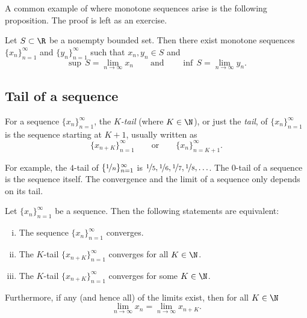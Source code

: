 A common example of where monotone sequences arise is the following
proposition.  The proof is left as an exercise.

\begin{prop} \label{prop:supinfseq}
Let $S \subset \R$ be a nonempty bounded set.
Then there exist monotone sequences
$\{ x_n \}_{n=1}^\infty$ and $\{ y_n \}_{n=1}^\infty$ such that $x_n, y_n \in S$ and
\begin{equation*}
\sup\,S = \lim_{n\to \infty} x_n \qquad \text{and} \qquad \inf\,S =
\lim_{n\to\infty} y_n .
\end{equation*}
\end{prop}

\subsection{Tail of a sequence}

\begin{defn}
For a sequence $\{ x_n \}_{n=1}^\infty$,
the \emph{$K$-tail} (where $K \in \N$),
or just the
\emph{tail}, of
$\{ x_n \}_{n=1}^\infty$ is the sequence starting at $K+1$, usually written as
\begin{equation*}
\{ x_{n+K} \}_{n=1}^\infty
\qquad \text{or} \qquad \{ x_n \}_{n=K+1}^\infty .
\end{equation*}
\end{defn}

For example, the $4$-tail of $\{ \nicefrac{1}{n} \}_{n=1}^\infty$ is
$\nicefrac{1}{5}, \nicefrac{1}{6}, \nicefrac{1}{7}, \nicefrac{1}{8},
\ldots$.  The $0$-tail of a sequence is the sequence itself.
The convergence and the limit of a sequence only depends on its tail.

\begin{prop}
Let $\{ x_n \}_{n=1}^\infty$ be a sequence.  Then the following
statements are equivalent:
\begin{enumerate}[(i)]
\item \label{prop:ktail:i}
The sequence $\{ x_n \}_{n=1}^\infty$ converges.
\item \label{prop:ktail:ii}
The $K$-tail $\{ x_{n+K} \}_{n=1}^\infty$ converges for all $K \in \N$.
\item \label{prop:ktail:iii}
The $K$-tail $\{ x_{n+K} \}_{n=1}^\infty$ converges for some $K \in \N$.
\end{enumerate}
Furthermore, if any (and hence all) of the limits exist, then for all $K \in \N$
\begin{equation*}
\lim_{n\to \infty} x_n = \lim_{n \to \infty} x_{n+K} .
\end{equation*}
\end{prop}

